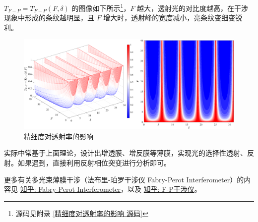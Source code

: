 \documentclass[UTF8]{report}
\theoremstyle{MyLineTheoremStyle} %
\theoremstyle{MyBlockTheoremStyle} %
\theoremstyle{MySubsubsectionStyle} %
\begin{document}
$T_{F-P} = T_{F-P}(F, \delta)$ 的图像如下所示\footnote{源码见附录 \ref{精细度对透射率的影响 源码}}，$F$ 越大，透射光的对比度越高，在干涉现象中形成的条纹越明显，且 $F$ 增大时，透射峰的宽度减小，亮条纹变细变锐利。

\begin{figure}[H]\centering
\includegraphics[width=\columnwidth]{assets/3/精细度对透射率的影响.pdf}
\caption{ 精细度对透射率的影响}\label{精细度对透射率的影响}
\end{figure}

实际中常基于上面理论，设计出增透膜、增反膜等薄膜，实现光的选择性透射、反射。如果遇到，直接利用反射相位突变进行分析即可。

更多有关多光束薄膜干涉（法布里-珀罗干涉仪 Fabry-Perot Interferometer）的内容见 \href{https://zhuanlan.zhihu.com/p/579184206}{知乎: Fabry-Perot Interferometer}，以及 \href{https://zhuanlan.zhihu.com/p/453978087}{知乎: F-P干涉仪}。

\end{document}
